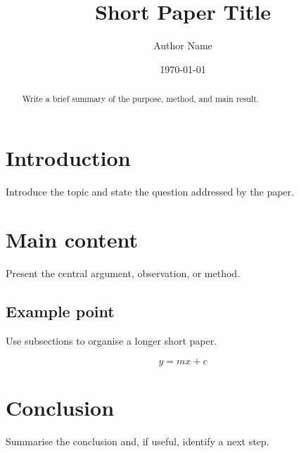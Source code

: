 \documentclass[11pt,a4paper]{article}
\title{Short Paper Title}
\author{Author Name}
\date{\today}
\makeatletter
\renewcommand{\maketitle}{%
  \begin{center}
    {\displayfont\LARGE\bfseries\color{LrssnPrimaryText}\@title\par}
    \vspace{0.5em}
    {\large\@author\par}
    {\small\color{LrssnMuted}\@date\par}
  \end{center}
  \vspace{1em}
}
\makeatother
\begin{document}
\maketitle

\begin{abstract}
\noindent
Write a brief summary of the purpose, method, and main result.
\end{abstract}

\section{Introduction}
Introduce the topic and state the question addressed by the paper.

\section{Main content}
Present the central argument, observation, or method.

\subsection{Example point}
Use subsections to organise a longer short paper.

\begin{equation}
    y = mx + c
\end{equation}

\section{Conclusion}
Summarise the conclusion and, if useful, identify a next step.
\end{document}
